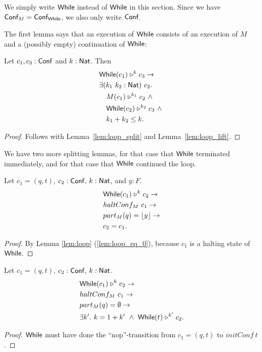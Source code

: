 We simply write $\textsf{While}$ instead of $\textsf{While}$ in this section.  Since we have $\textsf{Conf}_M = \textsf{Conf}_{\textsf{While}}$, we also only write $\textsf{Conf}$.

The first lemma says that an execution of $\textsf{While}$ consists of an execution of $M$ and a (possibly empty) continuation of $\textsf{While}$:
\begin{lemma}
  \label{lem:While_split}
  Let $c_1, c_3 : \textsf{Conf}$ and $k:\textsf{Nat}$.  Then
  \begin{alignat*}{1}
    & \textsf{While}(c_1) \mathrel{\triangleright}^k c_3 \rightarrow \\
    & \exists (k_1~k_2 : \textsf{Nat})~c_2. \\
    & \quad M(c_1) \mathrel{\triangleright}^{k_1} c_2 ~\land~ \\
    & \quad \textsf{While}(c_2) \mathrel{\triangleright}^{k_2} c_3 ~\land~\\
    & \quad k_1 + k_2 \leq k.
  \end{alignat*}
\end{lemma}
\begin{proof}
  Follows with Lemma~\ref{lem:loop_split} and Lemma~\ref{lem:loop_lift}.
\end{proof}

We have two more splitting lemmas, for that case that $\textsf{While}$ terminated immediately, and for that case that $\textsf{While}$ continued the loop.
\begin{lemma}
  \label{lem:While_split_term}
  Let $c_1 = (q, t)$, $c_2 : \textsf{Conf}$, $k:\textsf{Nat}$, and $y:F$.
  \begin{alignat*}{1}
    & \textsf{While}(c_1) \mathrel{\triangleright}^k c_2 \rightarrow \\
    & haltConf_M~c_1 \rightarrow \\
    & part_M(q) = \left\lfloor {y} \right\rfloor \rightarrow \\
    & c_2 = c_1.
  \end{alignat*}
\end{lemma}
\begin{proof}
  By Lemma \ref{lem:loop} (\ref{lem:loop_eq_0}), because $c_1$ is a halting state of $\textsf{While}$.
\end{proof}
\begin{lemma}
  \label{lem:While_split_repeat}
  Let $c_1 = (q, t)$, $c_2 : \textsf{Conf}$, $k:\textsf{Nat}$.
  \begin{alignat*}{1}
    & \textsf{While}(c_1) \mathrel{\triangleright}^k c_2 \rightarrow \\
    & haltConf_M~c_1 \rightarrow \\
    & part_M(q) = \emptyset \rightarrow \\
    & \exists k'.~k = 1+k' ~\land~ \textsf{While}(t) \mathrel{\triangleright}^{k'} c_2.
  \end{alignat*}
\end{lemma}
\begin{proof}
  $\textsf{While}$ must have done the ``nop''-transition from $c_1=(q,t)$ to $initConf~t$.
\end{proof}

